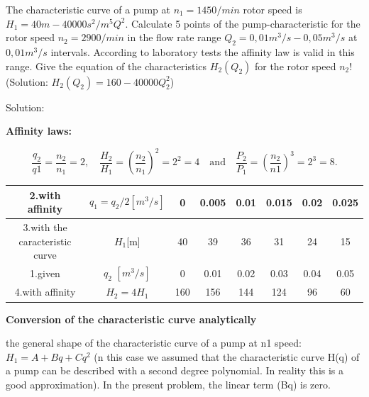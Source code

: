 \vspace{1cm}
\begin{tcolorbox}

The characteristic curve of a pump at $n_1 = 1450/min$ rotor speed is $H_1 = 40m-40000s^2/m^5 Q^2$. Calculate 5 points of the pump-characteristic for the rotor speed $n_2 = 2900/min$ in the flow rate range $Q_2 = 0,01m^3/s-0,05m^3/s$ at $0,01 m^3/s$ intervals. According to laboratory tests the affinity law is valid in this range. Give the equation of the characteristics $H_2(Q_2)$ for the rotor speed $n_2$! (Solution: $H_2(Q_2)=160-40000Q_{2}^{2}$)
\vspace{0.2cm}

Solution:
\vspace{0.2cm}

{\bf Affinity laws:}

\begin{equation*}
	\frac{q_2}{q1}=\frac{n_2}{n_1}=2, \quad
	\frac{H_2}{H_1}=\left(\frac{n_2}{n_1}\right)^2=2^2=4
	\quad \text{and} \quad \frac{P_2}{P_1}=\left(\frac{n_2}{n1}\right)^3=2^3=8.
\end{equation*}
\vspace{0.2cm}

\begin{center}
\begin{tabular}{|c|c|c|c|c|c|c|c|}
	\hline
2.with affinity & $q_1 =q_2/2[m^3/s]$ & 0 & 0.005 & 0.01 & 0.015 & 0.02  & 0.025 \\
	\hline
3.with the caracteristic curve	& $H_1$[m] & 40 & 39 & 36 & 31 & 24 & 15 \\
	\hline
1.given & $q_2$ $[m^3/s]$ & 0 & 0.01 & 0.02 & 0.03 & 0.04 & 0.05 \\
	\hline
4.with affinity	& $H_2=4H_1$ & 160 & 156 & 144 & 124 & 96 & 60 \\
	\hline
\end{tabular}
\end{center}

\vspace{0.2cm}

{\bf Conversion of the characteristic curve analytically}

the general shape of the characteristic curve of a pump at n1 speed: $H_1=A+Bq+Cq^2$ (n this case we assumed that the characteristic curve H(q) of a pump can be described with a second degree polynomial. In reality this is a good approximation). In the present problem, the linear term (Bq) is zero.


\end{tcolorbox}
